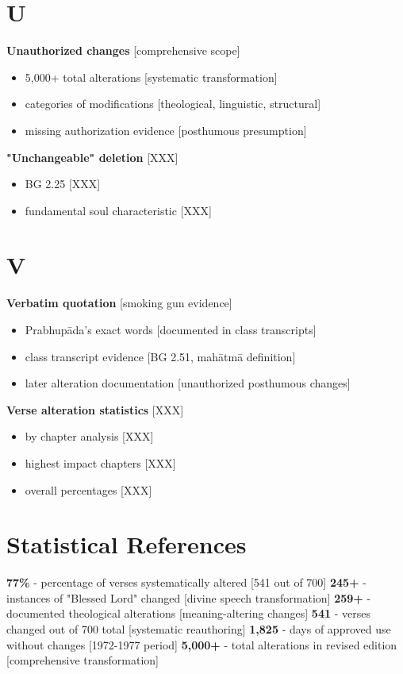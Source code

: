 \documentclass[11pt,twoside]{book}
\begin{document}
\section*{U}
\label{sec:orgca5612d}

\textbf{\textbf{Unauthorized changes}} {[}comprehensive scope]
\begin{itemize}
\item 5,000+ total alterations [systematic transformation]
\item categories of modifications [theological, linguistic, structural]
\item missing authorization evidence [posthumous presumption]
\end{itemize}

\textbf{\textbf{"Unchangeable" deletion}} {[}XXX]
\begin{itemize}
\item BG 2.25 [XXX]
\item fundamental soul characteristic [XXX]
\end{itemize}
\section*{V}
\label{sec:org6d84518}

\textbf{\textbf{Verbatim quotation}} {[}smoking gun evidence]
\begin{itemize}
\item Prabhupāda's exact words [documented in class transcripts]
\item class transcript evidence [BG 2.51, mahātmā definition]
\item later alteration documentation [unauthorized posthumous changes]
\end{itemize}

\textbf{\textbf{Verse alteration statistics}} {[}XXX]
\begin{itemize}
\item by chapter analysis [XXX]
\item highest impact chapters [XXX]
\item overall percentages [XXX]
\end{itemize}
\section*{Statistical References}
\label{sec:org51a706e}

\textbf{\textbf{77\%}} - percentage of verses systematically altered [541 out of 700]
\textbf{\textbf{245+}} - instances of "Blessed Lord" changed [divine speech transformation]
\textbf{\textbf{259+}} - documented theological alterations [meaning-altering changes]
\textbf{\textbf{541}} - verses changed out of 700 total [systematic reauthoring]
\textbf{\textbf{1,825}} - days of approved use without changes [1972-1977 period]
\textbf{\textbf{5,000+}} - total alterations in revised edition [comprehensive transformation]
\end{document}
